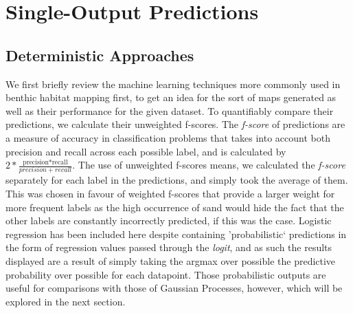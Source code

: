 
\section{Single-Output Predictions}

\subsection{Deterministic Approaches}

We first briefly review the machine learning techniques more commonly used in benthic habitat mapping first, to get an idea for the sort of maps generated as well as their performance for the given dataset. To quantifiably compare their predictions, we calculate their unweighted f-scores. The \textit{f-score} of predictions are a measure of accuracy in classification problems that takes into account both precision and recall across each possible label, and is calculated by $2*\frac{\text{precision*recall}}{precision+recall}$. The use of unweighted f-scores means, we calculated the \textit{f-score} separately for each label in the predictions, and simply took the average of them. This was chosen in favour of weighted f-scores that provide a larger weight for more frequent labels as the high occurrence of sand would hide the fact that the other labels are constantly incorrectly predicted, if this was the case. Logistic regression has been included here despite containing 'probabilistic` predictions in the form of regression values passed through the \textit{logit}, and as such the results displayed are a result of simply taking the argmax over possible the predictive probability over possible for each datapoint. Those probabilistic outputs are useful for comparisons with those of Gaussian Processes, however, which will be explored in the next section. 

